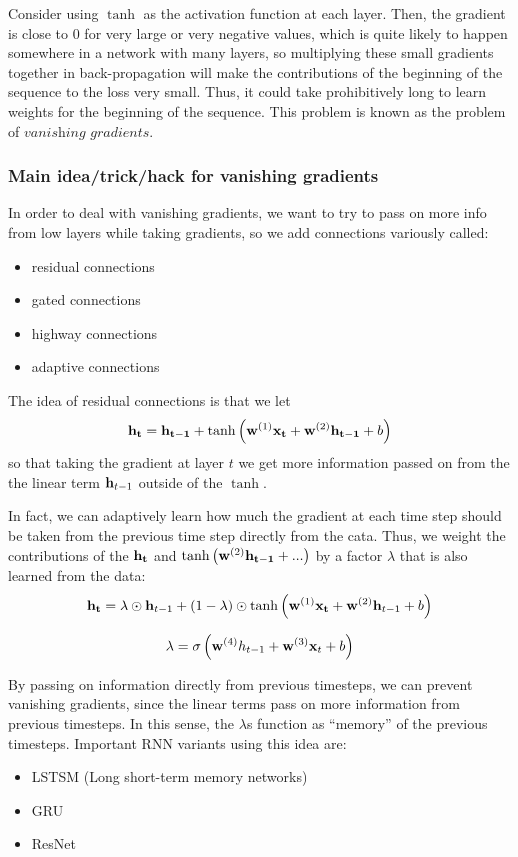 \documentclass{article}
\begin{document}
\vspace{0.1in}

Consider using $\tanh$ as the activation function at each layer. Then, the gradient is close to $0$ for very large or very negative values, which is quite likely to happen somewhere in a network with many layers, so multiplying these small gradients together in back-propagation will make the contributions of the beginning of the sequence to the loss very small. Thus, it could take prohibitively long to learn weights for the beginning of the sequence. This problem is known as the problem of $\textit{vanishing gradients}$.

\subsubsection{Main idea/trick/hack for vanishing gradients}

In order to deal with vanishing gradients, we want to try to pass on more info from low layers while taking gradients, so we add connections variously called:
\begin{itemize}
    \item residual connections
    \item gated connections
    \item highway connections
    \item adaptive connections
\end{itemize}

The idea of residual connections is that we let $$\bold{h_t} = \bold{h_{t-1}} + \tanh\left(\bold{w}^{(1)} \bold{x_t} + \bold{w}^{(2)} \bold{h_{t-1}} + b\right) $$ so that taking the gradient at layer $t$ we get more information passed on from the the linear term $\bold{h}_{t-1}$ outside of the $\tanh$.

In fact, we can adaptively learn how much the gradient at each time step should be taken from the previous time step directly from the cata. Thus, we weight the contributions of the $\bold{h_t}$ and $\tanh\left(\bold{w}^{(2)} \bold{h_{t-1}} +...\right)$ by a factor $\lambda$ that is also learned from the data:
$$\bold{h_t} = \lambda \odot \bold{h}_{t-1} + (1-\lambda) \odot \tanh\left(\bold{w}^{(1)} \bold{x_t} + \bold{w}^{(2)}  \bold{h}_{t-1} + b\right)$$ 

$$\lambda = \sigma\left(\bold{w}^{(4)}h_{t-1} + \bold{w}^{(3)} \bold{x}_t + b \right)$$

By passing on information directly from previous timesteps, we can prevent vanishing gradients, since the linear terms pass on more information from previous timesteps. In this sense, the $\lambda$s function as ``memory'' of the previous timesteps. Important RNN variants using this idea are:
\begin{itemize}
    \item LSTSM (Long short-term memory networks)
    \item GRU
    \item ResNet
\end{itemize}
\end{document}
